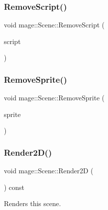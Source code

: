 \hypertarget{classmage_1_1_scene_a82705ba56543dea410439760b1667bc5}{}\label{classmage_1_1_scene_a82705ba56543dea410439760b1667bc5} 
\subsubsection{\texorpdfstring{Remove\+Script()}{RemoveScript()}}
{\footnotesize\ttfamily void mage\+::\+Scene\+::\+Remove\+Script (\begin{DoxyParamCaption}\item[{\hyperlink{namespacemage_a1e01ae66713838a7a67d30e44c67703e}{Shared\+Ptr}$<$ \hyperlink{classmage_1_1_behavior_script}{Behavior\+Script} $>$}]{script }\end{DoxyParamCaption})}

\hypertarget{classmage_1_1_scene_a6d886d48157b9988ab61cc9b01ee752e}{}\label{classmage_1_1_scene_a6d886d48157b9988ab61cc9b01ee752e} 
\subsubsection{\texorpdfstring{Remove\+Sprite()}{RemoveSprite()}}
{\footnotesize\ttfamily void mage\+::\+Scene\+::\+Remove\+Sprite (\begin{DoxyParamCaption}\item[{\hyperlink{namespacemage_a1e01ae66713838a7a67d30e44c67703e}{Shared\+Ptr}$<$ \hyperlink{classmage_1_1_sprite_object}{Sprite\+Object} $>$}]{sprite }\end{DoxyParamCaption})}

\hypertarget{classmage_1_1_scene_a53487349d68f0ffcc91b243d0cfb86a3}{}\label{classmage_1_1_scene_a53487349d68f0ffcc91b243d0cfb86a3} 
\subsubsection{\texorpdfstring{Render2\+D()}{Render2D()}}
{\footnotesize\ttfamily void mage\+::\+Scene\+::\+Render2D (\begin{DoxyParamCaption}{ }\end{DoxyParamCaption}) const}

Renders this scene. \hypertarget{classmage_1_1_scene_a51d2d441067d30cf3a444d6a80811f93}{}\label{classmage_1_1_scene_a51d2d441067d30cf3a444d6a80811f93} 
